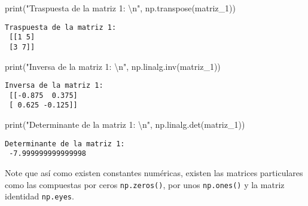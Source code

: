 \documentclass[
  letterpaper,
  DIV=11,
  numbers=noendperiod]{scrreprt}
\newenvironment{Shaded}{\begin{snugshade}}{\end{snugshade}}
\newcommand{\BuiltInTok}[1]{\textcolor[rgb]{0.00,0.23,0.31}{#1}}
\newcommand{\CharTok}[1]{\textcolor[rgb]{0.13,0.47,0.30}{#1}}
\newcommand{\NormalTok}[1]{\textcolor[rgb]{0.00,0.23,0.31}{#1}}
\newcommand{\StringTok}[1]{\textcolor[rgb]{0.13,0.47,0.30}{#1}}
\begin{document}
\begin{Shaded}
\begin{Highlighting}[]
\BuiltInTok{print}\NormalTok{(}\StringTok{"Traspuesta de la matriz 1: }\CharTok{\textbackslash{}n}\StringTok{"}\NormalTok{, np.transpose(matriz\_1))}
\end{Highlighting}
\end{Shaded}

\begin{verbatim}
Traspuesta de la matriz 1: 
 [[1 5]
 [3 7]]
\end{verbatim}

\begin{Shaded}
\begin{Highlighting}[]
\BuiltInTok{print}\NormalTok{(}\StringTok{"Inversa de la matriz 1: }\CharTok{\textbackslash{}n}\StringTok{"}\NormalTok{, np.linalg.inv(matriz\_1))}
\end{Highlighting}
\end{Shaded}

\begin{verbatim}
Inversa de la matriz 1: 
 [[-0.875  0.375]
 [ 0.625 -0.125]]
\end{verbatim}

\begin{Shaded}
\begin{Highlighting}[]
\BuiltInTok{print}\NormalTok{(}\StringTok{"Determinante de la matriz 1: }\CharTok{\textbackslash{}n}\StringTok{"}\NormalTok{, np.linalg.det(matriz\_1))}
\end{Highlighting}
\end{Shaded}

\begin{verbatim}
Determinante de la matriz 1: 
 -7.999999999999998
\end{verbatim}

\begin{tcolorbox}[enhanced jigsaw, opacityback=0, coltitle=black, toptitle=1mm, colframe=quarto-callout-note-color-frame, leftrule=.75mm, colback=white, opacitybacktitle=0.6, toprule=.15mm, breakable, bottomrule=.15mm, rightrule=.15mm, bottomtitle=1mm, titlerule=0mm, title=\textcolor{quarto-callout-note-color}{\faInfo}\hspace{0.5em}{Note}, colbacktitle=quarto-callout-note-color!10!white, left=2mm, arc=.35mm]

Note que así como existen constantes numéricas, existen las matrices
particulares como las compuestas por ceros \texttt{np.zeros()}, por unos
\texttt{np.ones()} y la matriz identidad \texttt{np.eyes}.

\end{tcolorbox}
\end{document}
